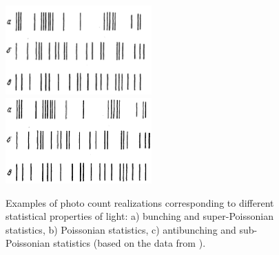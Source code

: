 \begin{figure}
\centering

\ifpdf
\includegraphics[angle=0, width=0.5\textwidth]
{./part3/nonclass/nonclassphoto.pdf}
\else
\includegraphics[angle=0, width=0.5\textwidth]
{./part3/nonclass/nonclassphoto.eps}
\fi
%

\caption{Examples of photo count realizations corresponding to different
  statistical properties of light: a) bunching and super-Poissonian
  statistics, b) Poissonian statistics, c) antibunching and
  sub-Poissonian statistics (based on the data from \cite{bNonclassSmirnovTroshin}). }
\label{figPart3Nonclass1}
\end{figure}